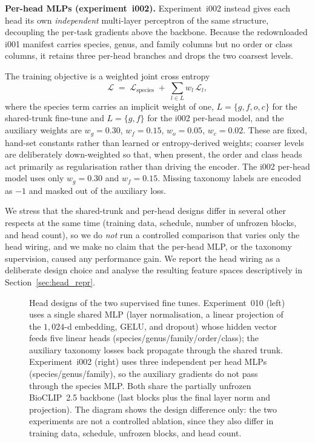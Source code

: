 \textbf{Per-head MLPs (experiment~i002).} Experiment~i002 instead gives each head its own
\emph{independent} multi-layer perceptron of the same structure, decoupling the per-task
gradients above the backbone. Because the redownloaded i001 manifest carries species, genus, and
family columns but no order or class columns, it retains three per-head branches and drops the
two coarsest levels.

The training objective is a weighted joint cross entropy
\begin{equation}
  \mathcal{L} \;=\; \mathcal{L}_{\text{species}} \;+\; \!\!\!\!\sum_{l \in L}\!\!\!\! w_l\,\mathcal{L}_l,
\end{equation}
where the species term carries an implicit weight of one, $L = \{g,f,o,c\}$ for the shared-trunk
fine-tune and $L = \{g,f\}$ for the i002 per-head model, and the auxiliary weights are
$w_g{=}0.30$, $w_f{=}0.15$, $w_o{=}0.05$, $w_c{=}0.02$. These are fixed, hand-set constants
rather than learned or entropy-derived weights; coarser levels are deliberately down-weighted so
that, when present, the order and class heads act primarily as regularisation rather than driving
the encoder. The i002 per-head model uses only $w_g{=}0.30$ and $w_f{=}0.15$. Missing taxonomy
labels are encoded as $-1$ and masked out of the auxiliary loss.

We stress that the shared-trunk and per-head designs differ in several other respects at the same
time (training data, schedule, number of unfrozen blocks, and head count), so we do \emph{not}
run a controlled comparison that varies only the head wiring, and we make no claim that the
per-head MLP, or the taxonomy supervision, caused any performance gain. We report the head wiring
as a deliberate design choice and analyse the resulting feature spaces descriptively in
Section~\ref{sec:head_repr}.

\begin{figure}[t]
  \centering
  \resizebox{0.95\linewidth}{!}{}
  \caption{Head designs of the two supervised fine tunes. Experiment~010 (left) uses a single shared MLP (layer normalisation, a linear projection of the $1{,}024$-d embedding, GELU, and dropout) whose hidden vector feeds five linear heads (species/genus/family/order/class); the auxiliary taxonomy losses back propagate through the shared trunk. Experiment~i002 (right) uses three independent per head MLPs (species/genus/family), so the auxiliary gradients do not pass through the species MLP. Both share the partially unfrozen BioCLIP~2.5 backbone (last blocks plus the final layer norm and projection). The diagram shows the design difference only: the two experiments are not a controlled ablation, since they also differ in training data, schedule, unfrozen blocks, and head count.}
  \label{fig:head_design}
\end{figure}


